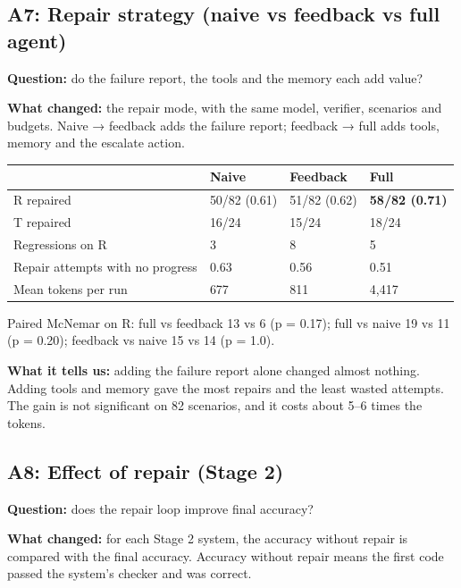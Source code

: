 \documentclass[11pt]{article}
\begin{document}
\subsection{A7: Repair strategy (naive vs feedback vs full agent)}

\textbf{Question:} do the failure report, the tools and the memory each
add value?

\textbf{What changed:} the repair mode, with the same model, verifier,
scenarios and budgets. Naive → feedback adds the failure report;
feedback → full adds tools, memory and the escalate action.

\begin{table}[!tp]
\centering\footnotesize\setlength{\tabcolsep}{3pt}\renewcommand{\arraystretch}{1.1}
\begin{tabularx}{\textwidth}{>{\raggedright\arraybackslash}Xlll}
\toprule
\textbf{} & \textbf{Naive} & \textbf{Feedback} & \textbf{Full} \\
\midrule
R repaired & 50/82 (0.61) & 51/82 (0.62) & \textbf{58/82 (0.71)} \\
T repaired & 16/24 & 15/24 & 18/24 \\
Regressions on R & 3 & 8 & 5 \\
Repair attempts with no progress & 0.63 & 0.56 & 0.51 \\
Mean tokens per run & 677 & 811 & 4,417 \\
\bottomrule
\end{tabularx}
\end{table}

Paired McNemar on R: full vs feedback 13 vs 6 (p = 0.17); full vs naive
19 vs 11 (p = 0.20); feedback vs naive 15 vs 14 (p = 1.0).

\textbf{What it tells us:} adding the failure report alone changed
almost nothing. Adding tools and memory gave the most repairs and the
least wasted attempts. The gain is not significant on 82 scenarios, and
it costs about 5--6 times the tokens.

\subsection{A8: Effect of repair (Stage 2)}

\textbf{Question:} does the repair loop improve final accuracy?

\textbf{What changed:} for each Stage 2 system, the accuracy without
repair is compared with the final accuracy. Accuracy without repair
means the first code passed the system's checker and was correct.
\end{document}
